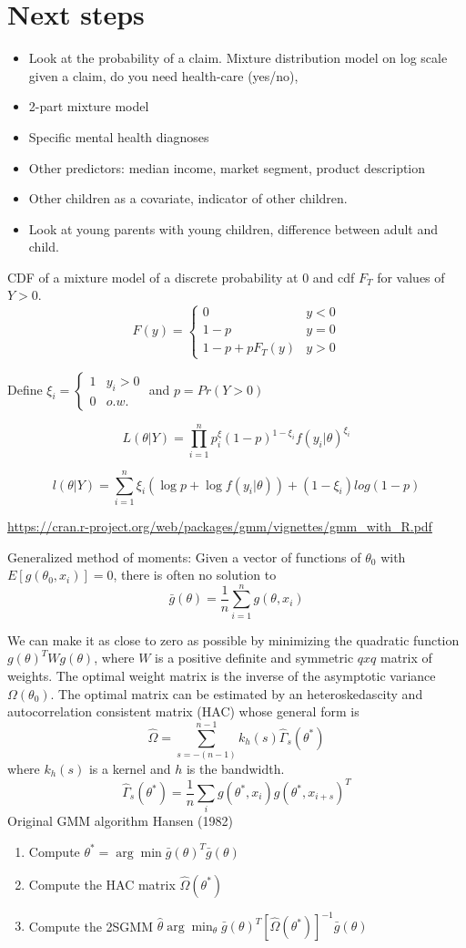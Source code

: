 \documentclass[a4paper, 11pt]{article}
\begin{document}
\section*{Next steps}
\begin{itemize}
\item Look at the probability of a claim. Mixture distribution model on log scale given a claim, do you need health-care (yes/no), 

\item	2-part mixture model
\item	Specific mental health diagnoses
\item	Other predictors: median income, market segment, product description
\item	Other children as a covariate, indicator of other children. 
\item	Look at young parents with young children, difference between adult and child. 
\end{itemize}

CDF of a mixture model of a discrete probability at 0 and cdf $F_T$ for values of $Y > 0$. 
$$F(y) = \begin{cases} 
0 & y < 0 \\
1-p & y = 0 \\
1-p+ pF_T(y) & y > 0
\end{cases} $$

Define $\xi_i = \begin{cases} 1 & y_i > 0 \\ 0 & o.w. \end{cases}$  and $p = Pr(Y > 0)$

$$L(\theta|Y) = \prod_{i=1}^n p^\xi_i(1-p)^{1-\xi_i}f(y_i|\theta)^{\xi_i}$$

$$l(\theta|Y) = \sum_{i=1}^n \xi_i( \log p + \log f(y_i|\theta) ) + (1-\xi_i)log(1-p)$$

\url{https://cran.r-project.org/web/packages/gmm/vignettes/gmm_with_R.pdf}

Generalized method of moments: 
Given a vector of functions of $\theta_0$ with $E[g(\theta_0, x_i)] = 0$, there is often no solution to 
$$\bar{g}(\theta) = \frac{1}{n}\sum_{i=1}^n g(\theta, x_i)$$

We can make it as close to zero as possible by minimizing the quadratic function $g(\theta)^T W g(\theta)$, where $W$ is a positive definite and symmetric $q x q$ matrix of weights. The optimal weight matrix is the inverse of the asymptotic variance $\Omega(\theta_0)$. The optimal matrix can be estimated by an heteroskedascity and autocorrelation consistent matrix (HAC) whose general form is 
$$ \hat{\Omega} = \sum_{s=-(n-1)}^{n-1} k_h(s)\hat{\Gamma}_s(\theta^*)$$
where $k_h(s)$ is a kernel and $h$ is the bandwidth. 
$$\hat{\Gamma}_s(\theta^*) = \frac{1}{n}\sum_i g(\theta^*, x_i)g(\theta^*, x_{i+s})^T$$
Original GMM algorithm Hansen (1982)
\begin{enumerate}
	\item Compute $\theta^* = \arg \min \bar{g}(\theta)^T\bar{g}(\theta)$
	\item Compute the HAC matrix $\hat\Omega(\theta^*)$
	\item Compute the 2SGMM $\hat{\theta} \arg\min_{\theta}\bar{g}(\theta)^T[\hat\Omega(\theta^*)]^{-1}\bar{g}(\theta)$
\end{enumerate}
\end{document}
